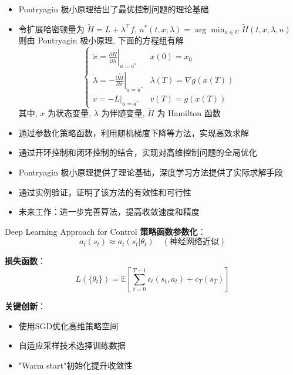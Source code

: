 \documentclass[aspectratio=169]{beamer}
\begin{document}
	\begin{frame}
		\begin{itemize}
			\item Pontryagin 极小原理给出了最优控制问题的理论基础
			\item 令扩展哈密顿量为 $\tilde{H} = L + \lambda^{\top} f$, $u^{*}\left(t, x; \lambda\right) = \arg\min_{u\in U} \tilde{H}\left(t, x, \lambda, u\right)$ 则由 Pontryagin 极小原理, 下面的方程组有解
				\begin{equation*}
					\left\{
						\begin{array}{ll}
							\left.\dot{x} = \frac{\partial \tilde{H}}{\partial \lambda}\right|_{u = u^{*}}	& x\left(0\right) = x_{0}										\\
							\left.\dot{\lambda} = -\frac{\partial \tilde{H}}{\partial x}\right|_{u = u^{*}}	& \lambda\left(T\right) = \nabla g\left(x\left(T\right)\right)	\\
							\left.\dot{v} = -L\right|_{u = u^{*}}											& v\left(T\right) = g\left(x\left(T\right)\right)
						\end{array}
					\right.
				\end{equation*}
				其中, $x$ 为状态变量, $\lambda$ 为伴随变量, $\tilde{H}$ 为 Hamilton 函数
			\item 通过参数化策略函数，利用随机梯度下降等方法，实现高效求解
			\item 通过开环控制和闭环控制的结合，实现对高维控制问题的全局优化
			\item Pontryagin 极小原理提供了理论基础，深度学习方法提供了实际求解手段
			\item 通过实例验证，证明了该方法的有效性和可行性
			\item 未来工作：进一步完善算法，提高收敛速度和精度
		\end{itemize}
	\end{frame}

	\begin{frame}{Deep Learning Approach for Control}
		\textbf{策略函数参数化}：
		\[
		a_t(s_t) \approx a_t(s_t|\theta_t) \quad (\text{神经网络近似})
		\]

		\textbf{损失函数}：
		\[
		L(\{\theta_t\}) = \mathbb{E}\left[ \sum_{t=0}^{T-1} c_t(s_t,a_t) + c_T(s_T) \right]
		\]

		\textbf{关键创新}：
		\begin{itemize}
			\item 使用SGD优化高维策略空间
			\item 自适应采样技术选择训练数据
			\item "Warm start"初始化提升收敛性
		\end{itemize}
	\end{frame}
\end{document}
